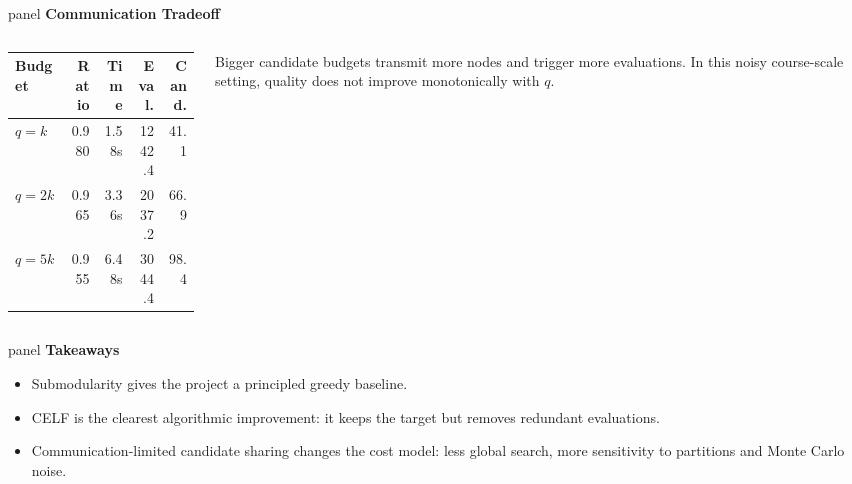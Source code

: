 \documentclass[final]{beamer}
\newcommand{\panel}[2]{%
  \begin{beamercolorbox}[wd=\linewidth,sep=0.32cm,rounded=true]{panel}
    {\color{deepteal}\bfseries\Large #1}\par
    \vspace{0.18cm}
    #2
  \end{beamercolorbox}
}
\begin{document}
\begin{frame}[t]
\begin{columns}[t,totalwidth=\textwidth]
\begin{column}{0.365\textwidth}
\vspace{0.36cm}
\panel{Communication Tradeoff}{
  \begin{columns}[T,totalwidth=\linewidth]
    \begin{column}{0.42\linewidth}
      \centering
      \begin{tabular}{lrrrr}
        \toprule
        Budget & Ratio & Time & Eval. & Cand. \\
        \midrule
        \(q=k\) & 0.980 & 1.58s & 1242.4 & 41.1 \\
        \(q=2k\) & 0.965 & 3.36s & 2037.2 & 66.9 \\
        \(q=5k\) & 0.955 & 6.48s & 3044.4 & 98.4 \\
        \bottomrule
      \end{tabular}
    \end{column}
    \begin{column}{0.54\linewidth}
      Bigger candidate budgets transmit more nodes and trigger more evaluations. In this noisy course-scale setting, quality does not improve monotonically with \(q\).
    \end{column}
  \end{columns}
}

\vspace{0.36cm}
\panel{Takeaways}{
  \begin{itemize}
    \item Submodularity gives the project a principled greedy baseline.
    \item CELF is the clearest algorithmic improvement: it keeps the target but removes redundant evaluations.
    \item Communication-limited candidate sharing changes the cost model: less global search, more sensitivity to partitions and Monte Carlo noise.
  \end{itemize}
}
\end{column}

\end{columns}


\end{frame}
\end{document}
